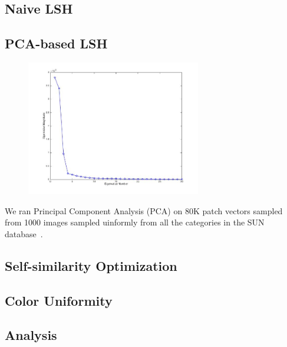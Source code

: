\subsection{Naive LSH}

\subsection{PCA-based LSH}

\begin{figure}[ht!]
\centering
\includegraphics[width=3in]{fig_NN/lambdas.jpg}
\label{fig:lambdas}
\end{figure}

We ran Principal Component Analysis (PCA) on 80K patch vectors
sampled from 1000 images
sampled uinformly from all the categories in the
SUN database~\cite{SUN}.


\subsection{Self-similarity Optimization}

\subsection{Color Uniformity}

\subsection{Analysis}

